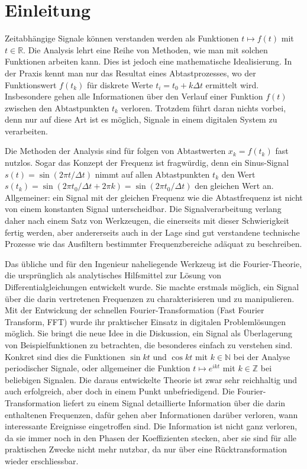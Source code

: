 %
%
%
\chapter*{Einleitung\label{chapter:einleitung}}
Zeitabhängige Signale können verstanden werden als Funktionen $t\mapsto f(t)$
mit $t\in\mathbb R$.
Die Analysis lehrt eine Reihe von Methoden, wie man mit solchen
Funktionen arbeiten kann.
Dies ist jedoch eine mathematische Idealisierung.
In der Praxis kennt man nur das Resultat eines Abtastprozesses, wo
der Funktionswert $f(t_k)$ für diskrete Werte $t_i=t_0 + k\Delta t$
ermittelt wird.
Insbesondere gehen alle Informationen über den Verlauf einer Funktion $f(t)$
zwischen den Abtastpunkten $t_k$ verloren.
Trotzdem führt daran nichts vorbei, denn nur auf diese Art ist es möglich,
Signale in einem digitalen System zu verarbeiten.

Die Methoden der Analysis sind für folgen von Abtastwerten $x_k=f(t_k)$
fast nutzlos.
Sogar das Konzept der Frequenz ist fragwürdig, denn ein Sinus-Signal
$s(t)=\sin(2\pi t/\Delta t)$ nimmt auf allen Abtastpunkten $t_k$
den Wert $s(t_k)=\sin(2\pi t_0/\Delta t+2\pi k)=\sin(2\pi t_0/\Delta t)$
den gleichen Wert an.
Allgemeiner: ein Signal mit der gleichen Frequenz wie die Abtastfrequenz
ist nicht von einem konstanten Signal unterscheidbar.
Die Signalverarbeitung verlang daher nach einem Satz von Werkzeugen, die
einerseits mit dieser Schwierigkeit fertig werden, aber andererseits auch
in der Lage sind gut verstandene technische Prozesse wie das Ausfiltern
bestimmter Frequenzbereiche adäquat zu beschreiben.

Das übliche und für den Ingenieur naheliegende Werkzeug ist die 
Fourier-Theorie, die ursprünglich als analytisches Hilfsmittel zur Lösung
von Differentialgleichungen entwickelt wurde.
Sie machte erstmals möglich, ein Signal über die darin vertretenen
Frequenzen zu charakterisieren und zu manipulieren.
Mit der Entwickung der schnellen Fourier-Transformation
(Fast Fourier Transform, FFT) wurde ihr praktischer Einsatz in digitalen
Problemlösungen möglich.
Sie bringt die neue Idee in die Diskussion, ein Signal als Überlagerung
von Beispielfunktionen zu betrachten, die besonderes einfach zu
verstehen sind.
Konkret sind dies die Funktionen $\sin kt$ und $\cos kt$ mit
$k\in\mathbb N$ bei der Analyse periodischer Signale,
oder allgemeiner die Funktion $t\mapsto e^{ikt}$ mit $k\in\mathbb Z$
bei beliebigen Signalen.
Die daraus entwickelte Theorie ist zwar sehr reichhaltig und auch erfolgreich,
aber doch in einem Punkt unbefriedigend.
Die Fourier-Transformation liefert zu einem Signal detaillierte Information
über die darin enthaltenen Frequenzen, dafür gehen aber Informationen
darüber verloren, wann interessante Ereignisse eingetroffen sind.
Die Information ist nicht ganz verloren, da sie immer noch in den Phasen
der Koeffizienten stecken, aber sie sind für alle praktischen Zwecke 
nicht mehr nutzbar, da nur über eine Rücktransformation wieder erschliessbar.

